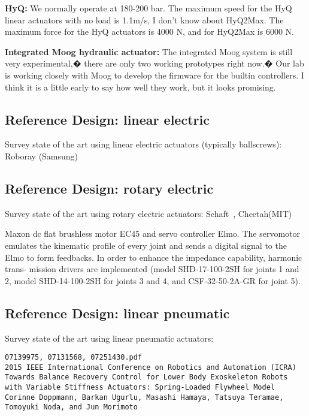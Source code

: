 \documentclass[letterpaper,12pt,fullpage]{article}
\begin{document}
{\bf HyQ:}
We normally operate at 180-200 bar. The maximum speed for the HyQ
linear actuators with no load is 1.1m/s, I don't know about HyQ2Max.
The maximum force for the HyQ actuators is 4000 N, and for HyQ2Max is
6000 N.

{\bf Integrated Moog hydraulic actuator:}
The integrated Moog system is still very experimental,� there are
only two working prototypes right now.� Our lab is working closely
with Moog to develop the firmware for the builtin controllers. I
think it is a little early to say how well they work, but it looks
promising.


\subsection{Reference Design: linear electric}

Survey state of the art using linear electric actuators (typically ballscrews):
Roboray (Samsung)

\subsection{Reference Design: rotary electric}

Survey state of the art using rotary electric actuators:
Schaft~\cite{shaft_foot_placement,shaft_push_recov}, Cheetah(MIT)

Maxon dc flat brushless motor EC45 and servo controller
Elmo. The servomotor emulates the kinematic profile of every
joint and sends a digital signal to the Elmo to form feedbacks.
In order to enhance the impedance capability, harmonic trans-
mission drivers are implemented (model SHD-17-100-2SH
for joints 1 and 2, model SHD-14-100-2SH for joints 3 and 4,
and CSF-32-50-2A-GR for joint 5).~\cite{IEEE07128705}

\subsection{Reference Design: linear pneumatic}

Survey state of the art using linear pneumatic actuators:

\begin{verbatim}
07139975, 07131568, 07251430.pdf
2015 IEEE International Conference on Robotics and Automation (ICRA)
Towards Balance Recovery Control for Lower Body Exoskeleton Robots
with Variable Stiffness Actuators: Spring-Loaded Flywheel Model
Corinne Doppmann, Barkan Ugurlu, Masashi Hamaya, Tatsuya Teramae,
Tomoyuki Noda, and Jun Morimoto
\end{verbatim}
\end{document}
